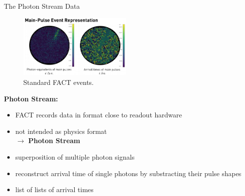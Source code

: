 \begin{frame}[t]{The Photon Stream Data}
  \begin{multicols}{2}
  \begin{figure}
      \centering
      \includegraphics[width=0.5\textwidth]{fig/standard.png}
      \caption{Standard FACT events.}
  \end{figure}
  \columnbreak
  \textbf{Photon Stream:}
  \begin{itemize}
      \item FACT records data in format close to readout hardware
      \item not intended as physics format \\ $\rightarrow$ \textbf{Photon Stream}
      \item superposition of multiple photon signals
      \item reconstruct arrival time of single photons by substracting their pulse shapes
      \item list of lists of arrival times
  \end{itemize}
  \end{multicols}

\end{frame}

